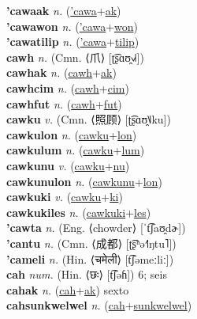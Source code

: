 \textbf{'cawaak} \textit{n.} (\hyperref['cawa]{'cawa}+\hyperref[ak]{ak})
 \label{'cawaak} \\
\textbf{'cawawon} \textit{n.} (\hyperref['cawa]{'cawa}+\hyperref[won]{won})
 \label{'cawawon} \\
\textbf{'cawatilip} \textit{n.} (\hyperref['cawa]{'cawa}+\hyperref[tilip]{tilip})
 \label{'cawatilip} \\
\textbf{cawh} \textit{n.} (Cmn. ⟨爪⟩ [ʈ͡ʂɑʊ̯˧˩˧])
 \label{cawh} \\
\textbf{cawhak} \textit{n.} (\hyperref[cawh]{cawh}+\hyperref[ak]{ak})
 \label{cawhak} \\
\textbf{cawhcim} \textit{n.} (\hyperref[cawh]{cawh}+\hyperref[cim]{cim})
 \label{cawhcim} \\
\textbf{cawhfut} \textit{n.} (\hyperref[cawh]{cawh}+\hyperref[fut]{fut})
 \label{cawhfut} \\
\textbf{cawku} \textit{v.} (Cmn. ⟨照顾⟩ [ʈ͡ʂɑʊ̯˥˩ku])
 \label{cawku} \\
\textbf{cawkulon} \textit{n.} (\hyperref[cawku]{cawku}+\hyperref[lon]{lon})
 \label{cawkulon} \\
\textbf{cawkulum} \textit{n.} (\hyperref[cawku]{cawku}+\hyperref[lum]{lum})
 \label{cawkulum} \\
\textbf{cawkunu} \textit{v.} (\hyperref[cawku]{cawku}+\hyperref[nu]{nu})
 \label{cawkunu} \\
\textbf{cawkunulon} \textit{n.} (\hyperref[cawkunu]{cawkunu}+\hyperref[lon]{lon})
 \label{cawkunulon} \\
\textbf{cawkuki} \textit{v.} (\hyperref[cawku]{cawku}+\hyperref[ki]{ki})
 \label{cawkuki} \\
\textbf{cawkukiles} \textit{n.} (\hyperref[cawkuki]{cawkuki}+\hyperref[les]{les})
 \label{cawkukiles} \\
\textbf{'cawta} \textit{n.} (Eng. ⟨chowder⟩ [ˈt͡ʃaʊ̯dɚ])
 \label{'cawta} \\
\textbf{'cantu} \textit{n.} (Cmn. ⟨成都⟩ [ʈ͡ʂʰə˧˥ŋtu˥])
 \label{'cantu} \\
\textbf{'cameli} \textit{n.} (Hin. ⟨चमेली⟩ [t͡ʃəmeːliː])
 \label{'cameli} \\
\textbf{cah} \textit{num.} (Hin. ⟨छः⟩ [t͡ʃəɦ])
6; seis \label{cah} \\
\textbf{cahak} \textit{n.} (\hyperref[cah]{cah}+\hyperref[ak]{ak})
sexto \label{cahak} \\
\textbf{cahsunkwelwel} \textit{n.} (\hyperref[cah]{cah}+\hyperref[sunkwelwel]{sunkwelwel})
 \label{cahsunkwelwel} \\

